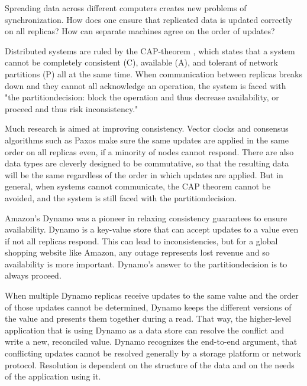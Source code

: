 
Spreading data across different computers creates new problems of
synchronization. How does one ensure that replicated data is updated correctly
on all replicas? How can separate machines agree on the order of updates?

Distributed systems are ruled by the \gls{CAP-theorem} \cite{cap_origin}, which
states that a system cannot be completely consistent (C), available (A), and
tolerant of network partitions (P) all at the same time. When communication
between replicas breaks down and they cannot all acknowledge an operation, the
system is faced with "the \gls{partitiondecision}: block the operation and thus
decrease availability, or proceed and thus risk
inconsistency."\cite{cap_years_later}

Much research is aimed at improving consistency. Vector
clocks\cite{lamport_ordering} and consensus algorithms such as
Paxos\cite{paxos_made_simple,paxos_made_moderately_complex} make sure the same
updates are applied in the same order on all replicas even, if a minority of
nodes cannot respond. There are also data types are cleverly designed to be
commutative, so that the resulting data will be the same regardless of the order
in which updates are applied\cite{crdt_orig}. But in general, when systems
cannot communicate, the CAP theorem cannot be avoided\cite{cap_proof}, and the
system is still faced with the \gls{partitiondecision}.

Amazon's Dynamo\cite{dynamo} was a pioneer in relaxing consistency guarantees to
ensure availability. Dynamo is a key-value store that can accept updates to a
value even if not all replicas respond. This can lead to inconsistencies, but
for a global shopping website like Amazon, any outage represents lost revenue
and so availability is more important. Dynamo's answer to the
\gls{partitiondecision} is to always proceed.

When multiple Dynamo replicas receive updates to the same value and the order of
those updates cannot be determined, Dynamo keeps the different versions of the
value and presents them together during a read. That way, the higher-level
application that is using Dynamo as a data store can resolve the conflict and
write a new, reconciled value. Dynamo recognizes the end-to-end
argument\cite{endtoendargument}, that conflicting updates cannot be resolved
generally by a storage platform or network protocol. Resolution is dependent on
the structure of the data and on the needs of the application using it.


